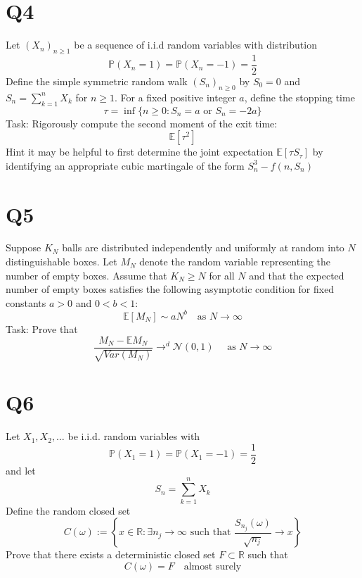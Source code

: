 \documentclass[11pt]{article}
\begin{document}
\section{Q4}
Let $(X_n)_{n \ge 1}$ be a sequence of i.i.d random variables with distribution
 \[
\mathbb{P}(X_n = 1) = \mathbb{P}(X_n = -1) = \frac{1}{2}
\] 
Define the simple symmetric random walk $(S_n)_{n \ge 0} $ by  $S_0 = 0$ and $S_n = \sum_{k=1}^{n}X_k$ for $n \ge 1$.
For a fixed positive integer  $a$, define the stopping time
\[
    \tau = \inf\{n \ge 0: S_n = a \text{ or } S_n = -2a\}
\] 
Task: Rigorously compute the second moment of the exit time:
\[
    \mathbb{E}[\tau^2]
\] 
Hint it may be helpful to first determine the joint expectation $ \mathbb{E}[\tau S_{\tau}] $ by identifying an appropriate 
cubic martingale of the form $S_n^{3} - f(n,S_n)$ 

\section{Q5}
Suppose $K_N$ balls are distributed independently and uniformly at random into  $N$ distinguishable boxes.
Let $M_N$ denote the random variable representing the number of empty boxes.
Assume that  $K_N \ge N$ for all  $N$ and that the expected number of empty boxes satisfies the following asymptotic condition for fixed constants  $a > 0$ and  $0 < b < 1$:
 \[
     \mathbb{E}[M_N] \sim aN^{b} \quad \text{as } N \to \infty
\] 
Task: Prove that
\[
    \frac{M_N - \mathbb{E}M_N}{\sqrt{Var(M_N)}} \to^{d} \mathcal{N}(0,1) \quad \text{ as } N \to \infty
\] 

\section{Q6}
Let $X_1,X_2,\dots$ be i.i.d. random variables with
\[
\mathbb{P}(X_1 = 1) = \mathbb{P}(X_1 = -1) = \frac{1}{2}
\] 
and let
\[
S_n = \sum_{k=1}^{n} X_k
\] 
Define the random closed set
\[
    C(\omega) := \left\{x \in \mathbb{R}: \exists n_j \to \infty \text{ such that }  \frac{S_{n_j}(\omega)}{\sqrt{n_j}} \to x\right\}
\] 
Prove that there exists a deterministic closed set $F \subset \mathbb{R}$ such that
\[
    C(\omega) = F \quad \text{almost surely}
\] 
\end{document}
